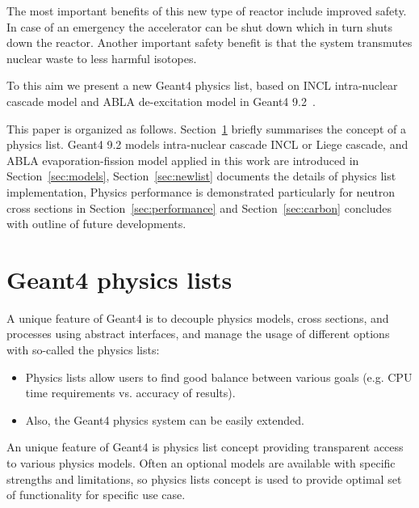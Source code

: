 \documentclass[a4paper]{jpconf}
\begin{document}
The most important benefits of
this new type of reactor include improved safety. In case of an
emergency the accelerator can be shut down which in turn shuts down
the reactor. Another important safety benefit is that the system
transmutes nuclear waste to less harmful isotopes.


To this aim we present a new Geant4 physics list, 
based on INCL \cite{incl} intra-nuclear cascade model and ABLA de-excitation model in Geant4 9.2~\cite{g4}. 




This paper is organized as follows.
Section~\ref{sec:list} briefly summarises the concept of a physics list.
Geant4 9.2 models intra-nuclear cascade INCL or Liege cascade, and ABLA evaporation-fission model
applied in this work are introduced in Section~\ref{sec:models},
Section~\ref{sec:newlist} documents the details of physics list implementation, 
Physics performance is demonstrated particularly for 
neutron  cross sections in Section~\ref{sec:performance} and
Section~\ref{sec:carbon} concludes with outline of future developments.


\section{Geant4 physics lists}\label{sec:list}

A unique feature of Geant4 is to  
decouple physics models, cross sections, and processes
using abstract interfaces, and manage the usage of different options with so-called the physics lists:
\begin{itemize}
\item Physics lists allow users to find good balance between various goals (e.g. CPU
time requirements vs. accuracy of results).
\item Also, the Geant4 physics system can be easily extended.
\end{itemize}

An unique feature of Geant4 is physics list concept providing transparent access 
to various physics models. 
Often an optional models are available with specific strengths and limitations, 
so physics lists concept is used to
provide optimal set of functionality for specific use case.
\end{document}
